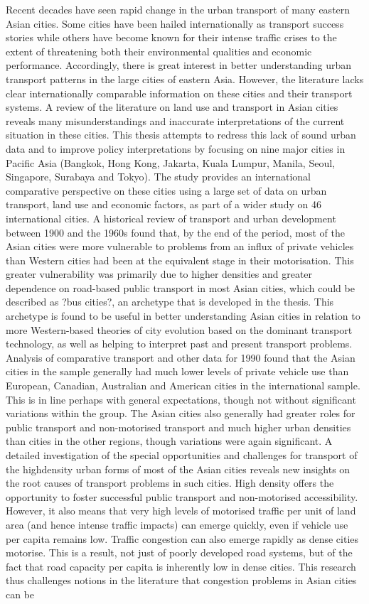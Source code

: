 Recent decades have seen rapid change in the urban transport of many eastern Asian cities. Some cities have been hailed internationally as transport success stories while others have become known for their intense traffic crises to the extent of threatening both their environmental qualities and economic performance. Accordingly, there is great interest in better understanding urban transport patterns in the large cities of eastern Asia. However, the literature lacks clear internationally comparable information on these cities and their transport systems. A review of the literature on land use and transport in Asian cities reveals many misunderstandings and inaccurate interpretations of the current situation in these cities. This thesis attempts to redress this lack of sound urban data and to improve policy interpretations by focusing on nine major cities in Pacific Asia (Bangkok, Hong Kong, Jakarta, Kuala Lumpur, Manila, Seoul, Singapore, Surabaya and Tokyo). The study provides an international comparative perspective on these cities using a large set of data on urban transport, land use and economic factors, as part of a wider study on 46 international cities. A historical review of transport and urban development between 1900 and the 1960s found that, by the end of the period, most of the Asian cities were more vulnerable to problems from an influx of private vehicles than Western cities had been at the equivalent stage in their motorisation. This greater vulnerability was primarily due to higher densities and greater dependence on road-based public transport in most Asian cities, which could be described as ?bus cities?, an archetype that is developed in the thesis. This archetype is found to be useful in better understanding Asian cities in relation to more Western-based theories of city evolution based on the dominant transport technology, as well as helping to interpret past and present transport problems. Analysis of comparative transport and other data for 1990 found that the Asian cities in the sample generally had much lower levels of private vehicle use than European, Canadian, Australian and American cities in the international sample. This is in line perhaps with general expectations, though not without significant variations within the group. The Asian cities also generally had greater roles for public transport and non-motorised transport and much higher urban densities than cities in the other regions, though variations were again significant. A detailed investigation of the special opportunities and challenges for transport of the highdensity urban forms of most of the Asian cities reveals new insights on the root causes of transport problems in such cities. High density offers the opportunity to foster successful public transport and non-motorised accessibility. However, it also means that very high levels of motorised traffic per unit of land area (and hence intense traffic impacts) can emerge quickly, even if vehicle use per capita remains low. Traffic congestion can also emerge rapidly as dense cities motorise. This is a result, not just of poorly developed road systems, but of the fact that road capacity per capita is inherently low in dense cities. This research thus challenges notions in the literature that congestion problems in Asian cities can be 